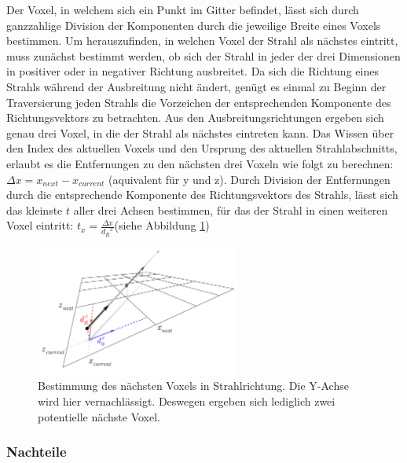 Der Voxel, in welchem sich ein Punkt im Gitter befindet, lässt sich durch ganzzahlige Division der Komponenten durch die jeweilige Breite eines Voxels bestimmen. Um herauszufinden, in welchen Voxel der Strahl als nächstes eintritt, muss zunächst bestimmt werden, ob sich der Strahl in jeder der drei Dimensionen in positiver oder in negativer Richtung ausbreitet. Da sich die Richtung eines Strahls während der Ausbreitung nicht ändert, genügt es einmal zu Beginn der Traversierung jeden Strahls die Vorzeichen der entsprechenden Komponente des Richtungsvektors zu betrachten.
Aus den Ausbreitungsrichtungen ergeben sich genau drei Voxel, in die der Strahl als nächstes eintreten kann.
Das Wissen über den Index des aktuellen Voxels und den Ursprung des aktuellen Strahlabschnitts, erlaubt es die Entfernungen zu den nächsten drei Voxeln wie folgt zu berechnen: ${\Delta}x = x_{next} - x_{current}$ (aquivalent für y und z). Durch Division der Entfernungen durch die entsprechende Komponente des Richtungsvektors des Strahls, lässt sich das kleinste $t$ aller drei Achsen bestimmen, für das der Strahl in einen weiteren Voxel eintritt: $t_x = \frac{{\Delta}x}{{d_R}^x}$(siehe Abbildung \ref{fig:nextcell})

\begin{figure}\centering
\includegraphics[width=0.6\textwidth]{images/nextcell.pdf}
\caption[Bestimmung des nächsten Voxels bei Gittertraversierung]{Bestimmung des nächsten Voxels in Strahlrichtung. Die Y-Achse wird hier vernachlässigt. Deswegen ergeben sich lediglich zwei potentielle nächste Voxel.}
\label{fig:nextcell}
\end{figure}


\subsubsection{Nachteile}

